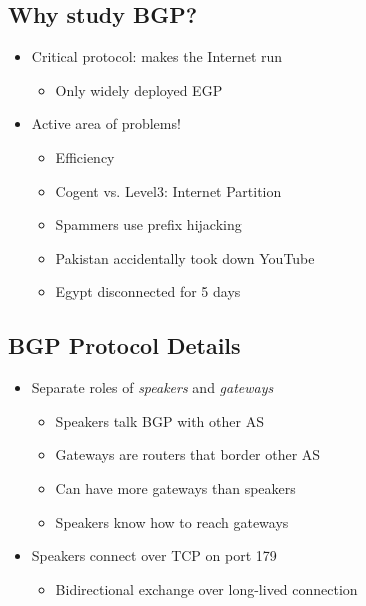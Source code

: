 \subsection{Why study BGP?}
\begin{itemize}[nosep]
    \item Critical protocol: makes the Internet run
          \begin{itemize}[nosep]
              \item Only widely deployed EGP
          \end{itemize}
    \item Active area of problems!
          \begin{itemize}[nosep]
              \item Efficiency
              \item Cogent vs. Level3: Internet Partition
              \item Spammers use prefix hijacking
              \item Pakistan accidentally took down YouTube
              \item Egypt disconnected for 5 days
          \end{itemize}
\end{itemize}
\subsection{BGP Protocol Details}
\begin{itemize}[nosep]
    \item Separate roles of \emph{speakers} and \emph{gateways}
          \begin{itemize}[nosep]
              \item Speakers talk BGP with other AS
              \item Gateways are routers that border other AS
              \item Can have more gateways than speakers
              \item Speakers know how to reach gateways
          \end{itemize}
    \item Speakers connect over TCP on port 179
          \begin{itemize}[nosep]
              \item Bidirectional exchange over long-lived connection
          \end{itemize}
\end{itemize}

